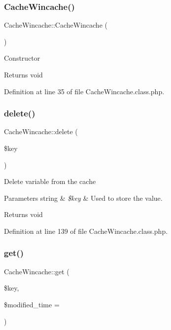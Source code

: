 \subsubsection{\texorpdfstring{Cache\+Wincache()}{CacheWincache()}}
{\footnotesize\ttfamily Cache\+Wincache\+::\+Cache\+Wincache (\begin{DoxyParamCaption}{ }\end{DoxyParamCaption})}

Constructor

\begin{DoxyReturn}{Returns}
void 
\end{DoxyReturn}


Definition at line 35 of file Cache\+Wincache.\+class.\+php.

\hypertarget{classCacheWincache_ae7bfddf70b319e76b50f06d50ec720a2}{}\label{classCacheWincache_ae7bfddf70b319e76b50f06d50ec720a2} 
\subsubsection{\texorpdfstring{delete()}{delete()}}
{\footnotesize\ttfamily Cache\+Wincache\+::delete (\begin{DoxyParamCaption}\item[{}]{\$key }\end{DoxyParamCaption})}

Delete variable from the cache


\begin{DoxyParams}[1]{Parameters}
string & {\em \$key} & Used to store the value. \\
\hline
\end{DoxyParams}
\begin{DoxyReturn}{Returns}
void 
\end{DoxyReturn}


Definition at line 139 of file Cache\+Wincache.\+class.\+php.

\hypertarget{classCacheWincache_a36123121cdf50235b64929c3a13b596b}{}\label{classCacheWincache_a36123121cdf50235b64929c3a13b596b} 
\subsubsection{\texorpdfstring{get()}{get()}}
{\footnotesize\ttfamily Cache\+Wincache\+::get (\begin{DoxyParamCaption}\item[{}]{\$key,  }\item[{}]{\$modified\+\_\+time = {} }\end{DoxyParamCaption})}


